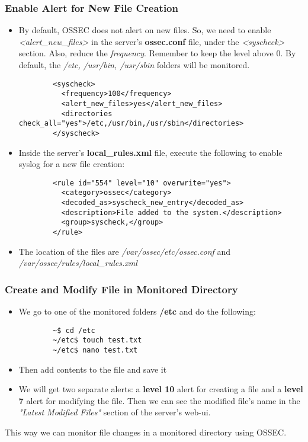 \documentclass{article}
\begin{document}
\subsubsection{Enable Alert for New File Creation}
\begin{itemize}
    \item By default, OSSEC does not alert on new files. So, we need to enable \textit{<alert\_new\_files> } in the server's \textbf{ossec.conf } file, under the \textit{<syscheck> } section. Also, reduce the \textit{frequency}. Remember to keep the level above 0. By default, the \textit{/etc, /usr/bin, /usr/sbin } folders will be monitored.
    {
    \color{customGreen}%
    \begin{verbatim}
        <syscheck>
          <frequency>100</frequency>
          <alert_new_files>yes</alert_new_files>
          <directories check_all="yes">/etc,/usr/bin,/usr/sbin</directories>
        </syscheck>
    \end{verbatim}
    }
    \item Inside the server's \textbf{local\_rules.xml } file, execute the following to enable syslog for a new file creation:
    {
    \color{customGreen}%
    \begin{verbatim}
        <rule id="554" level="10" overwrite="yes">
          <category>ossec</category>
          <decoded_as>syscheck_new_entry</decoded_as>
          <description>File added to the system.</description>
          <group>syscheck,</group>
        </rule>
    \end{verbatim}
    }
    \item The location of the files are \textit{/var/ossec/etc/ossec.conf } and \textit{/var/ossec/rules/local\_rules.xml}
\end{itemize}

\subsubsection{Create and Modify File in Monitored Directory}
\begin{itemize}
    \item We go to one of the monitored folders \textbf{/etc } and do the following:
    {
    \color{orange}%
    \begin{verbatim}
        ~$ cd /etc
        ~/etc$ touch test.txt
        ~/etc$ nano test.txt
    \end{verbatim}
    }
    \item Then add contents to the file and save it
    \item We will get two separate alerts: a \textbf{level 10} alert for creating a file and a \textbf{level 7} alert for modifying the file. Then we can see the modified file's name in the \textit{"Latest Modified Files" } section of the server's web-ui.
\end{itemize}
This way we can monitor file changes in a monitored directory using OSSEC.
\end{document}
